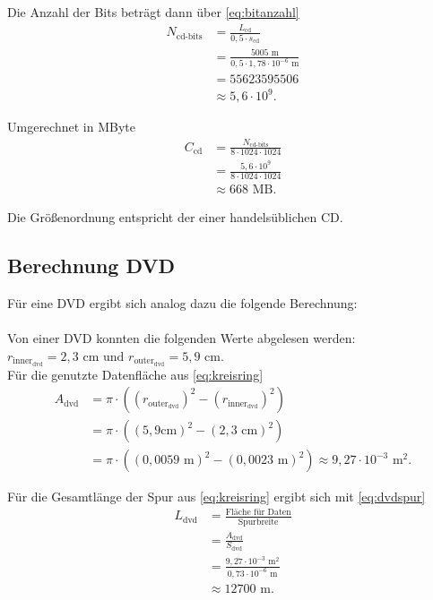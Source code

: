 \documentclass[9pt,twocolumn,twoside]{pnas-new}
\begin{document}
Die Anzahl der Bits beträgt dann über \eqref{eq:bitanzahl}
\begin{align*}
N_{\mbox{cd-bits}} &=  \frac{L_{\mbox{cd}}}{0,5\cdot s_{\mbox{cd}}}\\
&= \frac{5005\mbox{ m}}{0,5 \cdot 1,78 \cdot 10^{-6}\mbox{ m}}\\
&= 55623595506 \\
&\approx 5,6 \cdot 10^9.
\end{align*}

Umgerechnet in MByte
\begin{align*}
C_{\mbox{cd}} &= \frac{N_{\mbox{cd-bits}}}{8\cdot1024\cdot1024}\\
&= \frac{ 5,6\cdot10^9}{8\cdot1024\cdot1024}\\
&\approx 668\mbox{ MB}.
\end{align*}

Die Größenordnung entspricht der einer handelsüblichen CD.

\subsection{Berechnung DVD}
Für eine DVD ergibt sich analog dazu die folgende Berechnung: \\ \\
Von einer DVD konnten die folgenden Werte abgelesen werden: \begin{math} r_{\mbox{inner}_{\mbox{dvd}}} = 2,3 \mbox{ cm und } r_{\mbox{outer}_{\mbox{dvd}}} = 5,9 \mbox{ cm} \end{math}. \\

Für die genutzte Datenfläche aus \eqref{eq:kreisring}
\begin{align*}
 A_{\mbox{dvd}} &= \pi\cdot((r_{\mbox{outer}_{\mbox{dvd}}})^2-(r_{\mbox{inner}_{\mbox{dvd}}})^2)  \\	
&= \pi\cdot((5,9\mbox{cm})^2-(2,3\mbox{ cm})^2) \\
 &=  \pi\cdot((0,0059\mbox{ m})^2-(0,0023\mbox{ m})^2) \approx 9,27\cdot10^{-3}\mbox{ m}^2.
\end{align*}

Für die Gesamtlänge der Spur aus \eqref{eq:kreisring} ergibt sich mit \eqref{eq:dvdspur}
\begin{align*}
 L_{\mbox{dvd}} &= \frac{\mbox{Fläche für Daten}}{\mbox{Spurbreite}}\\
 &= \frac{A_{\mbox{dvd}}}{S_{\mbox{dvd}}}\\
 &= \frac{9,27\cdot10^{-3}\mbox{ m}^2}{0,73\cdot10^{-6}\mbox{ m} }\\
 &\approx 12700\mbox{ m}.
\end{align*}
\end{document}
